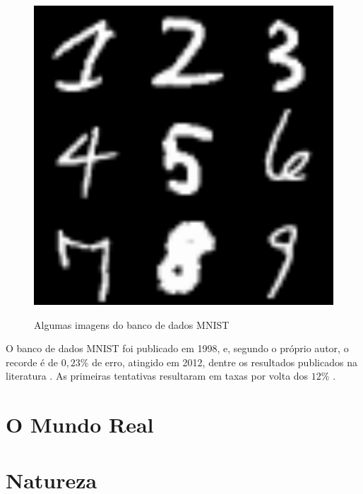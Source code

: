 \begin{figure}[H]
\caption{Algumas imagens do banco de dados MNIST}
\centering
\includegraphics[width=0.5\linewidth]{static/MNIST.png}
\label{fig:2:mnist}
\end{figure}

O banco de dados MNIST foi publicado em 1998, e, segundo o próprio autor, o recorde é de $0,23\%$ de erro, atingido em 2012, dentre os resultados publicados na literatura \cite{cireşan_multicolumn_2012}.
As primeiras tentativas resultaram em taxas por volta dos $12\%$ \cite{lecun_mnist_1998}.
\section{O Mundo Real}\label{sec:2:exemplo-real}
\section{Natureza}
